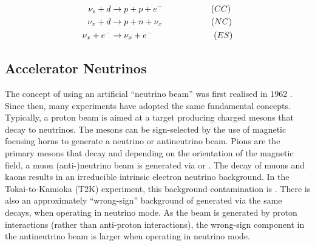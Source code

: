 \begin{equation}
  \label{eq:NeutrinoOscillationPhysics_SNOInteractions}
  \begin{split}
    \nu_{e} + d &\rightarrow p + p + e^{-} \hspace{2cm} (CC) \\
    \nu_{x} + d &\rightarrow p + n + \nu_{x} \hspace{2.02cm} (NC) \\
    \nu_{x} + e^{-} &\rightarrow \nu_{x} + e^{-} \hspace{2.55cm} (ES)
  \end{split}
\end{equation}


\subsection{Accelerator Neutrinos}
\label{subsec:NeutrinoOscillationPhysics_AcceleratorNeutrinos}

The concept of using an artificial ``neutrino beam'' was first realised in 1962 \cite{PhysRevLett.9.36}.
Since then, many experiments have adopted the same fundamental concepts. Typically, a proton beam is aimed at a target producing charged mesons that decay to neutrinos. The mesons can be sign-selected by the use of magnetic focusing horns to generate a neutrino or antineutrino beam.
Pions are the primary mesons that decay and depending on the orientation of the magnetic field, a muon (anti-)neutrino beam is generated via \quickmath{\pi^{+} \rightarrow \mu^{+} + \nu_{\mu}} or \quickmath{\pi^{-} \rightarrow \mu^{-} + \bar{\nu}_{\mu}}. The decay of muons and kaons results in an irreducible intrinsic electron neutrino background. In the Tokai-to-Kamioka (T2K) experiment, this background contamination is  \cite{PhysRevD.87.012001}. There is also an approximately  ``wrong-sign'' background of \quickmath{\bar{\nu}_{\mu}} generated via the same decays, when operating in neutrino mode. As the beam is generated by proton interactions (rather than anti-proton interactions), the wrong-sign component in the antineutrino beam is larger when operating in neutrino mode.

